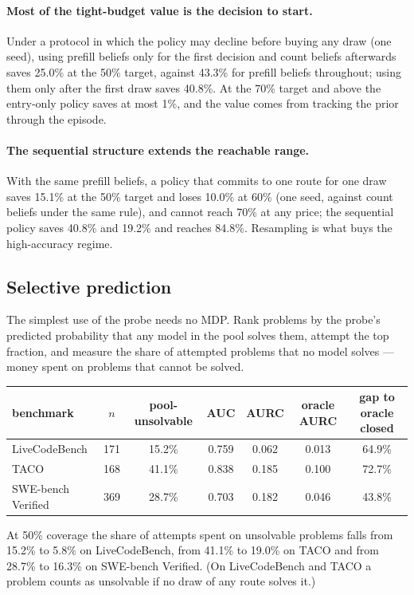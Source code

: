 \documentclass[10pt]{article} %
\begin{document}
\paragraph{Most of the tight-budget value is the decision to start.}
Under a protocol in which the policy may decline before buying any draw (one seed), using
prefill beliefs only for the first decision and count beliefs afterwards saves 25.0\% at the
50\% target, against 43.3\% for prefill beliefs throughout; using them only after the first draw
saves 40.8\%.  At the 70\% target and above the entry-only policy saves at most 1\%, and the
value comes from tracking the prior through the episode.

\paragraph{The sequential structure extends the reachable range.}
With the same prefill beliefs, a policy that commits to one route for one draw saves 15.1\% at
the 50\% target and loses 10.0\% at 60\% (one seed, against count beliefs under the same rule),
and cannot reach 70\% at any price; the sequential policy saves 40.8\% and 19.2\% and reaches
84.8\%.  Resampling is what buys the high-accuracy regime.

\subsection{Selective prediction}
\label{sec:selective}

The simplest use of the probe needs no MDP.  Rank problems by the probe's predicted probability
that any model in the pool solves them, attempt the top fraction, and measure the share of
attempted problems that no model solves --- money spent on problems that cannot be solved.

\begin{center}
\small
\begin{tabular}{lcccccc}
\toprule
benchmark & $n$ & pool-unsolvable & AUC & AURC & oracle AURC & gap to oracle closed \\
\midrule
LiveCodeBench & 171 & 15.2\% & 0.759 & 0.062 & 0.013 & 64.9\% \\
TACO & 168 & 41.1\% & 0.838 & 0.185 & 0.100 & 72.7\% \\
SWE-bench Verified & 369 & 28.7\% & 0.703 & 0.182 & 0.046 & 43.8\% \\
\bottomrule
\end{tabular}
\end{center}
At 50\% coverage the share of attempts spent on unsolvable problems falls from 15.2\% to 5.8\% on
LiveCodeBench, from 41.1\% to 19.0\% on TACO and from 28.7\% to 16.3\% on SWE-bench Verified.
(On LiveCodeBench and TACO a problem counts as unsolvable if no draw of any route solves it.)
\end{document}
